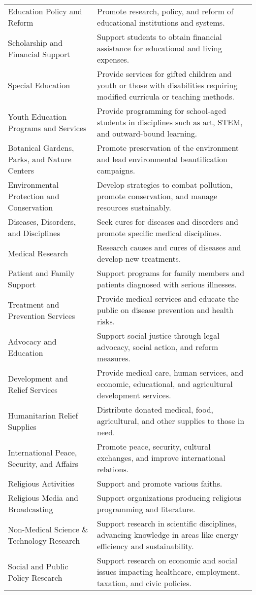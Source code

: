 \begin{table}[h!]
\begin{tabular}{p{5cm} p{10cm}}
Education Policy and Reform & Promote research, policy, and reform of educational institutions and systems. \\
Scholarship and Financial Support & Support students to obtain financial assistance for educational and living expenses. \\
Special Education & Provide services for gifted children and youth or those with disabilities requiring modified curricula or teaching methods. \\
Youth Education Programs and Services & Provide programming for school-aged students in disciplines such as art, STEM, and outward-bound learning. \\
Botanical Gardens, Parks, and Nature Centers & Promote preservation of the environment and lead environmental beautification campaigns. \\
Environmental Protection and Conservation & Develop strategies to combat pollution, promote conservation, and manage resources sustainably. \\
Diseases, Disorders, and Disciplines & Seek cures for diseases and disorders and promote specific medical disciplines. \\
Medical Research & Research causes and cures of diseases and develop new treatments. \\
Patient and Family Support & Support programs for family members and patients diagnosed with serious illnesses. \\
Treatment and Prevention Services & Provide medical services and educate the public on disease prevention and health risks. \\
Advocacy and Education & Support social justice through legal advocacy, social action, and reform measures. \\
Development and Relief Services & Provide medical care, human services, and economic, educational, and agricultural development services. \\
Humanitarian Relief Supplies & Distribute donated medical, food, agricultural, and other supplies to those in need. \\
International Peace, Security, and Affairs & Promote peace, security, cultural exchanges, and improve international relations. \\
Religious Activities & Support and promote various faiths. \\
Religious Media and Broadcasting & Support organizations producing religious programming and literature. \\
Non-Medical Science \& Technology Research & Support research in scientific disciplines, advancing knowledge in areas like energy efficiency and sustainability. \\
Social and Public Policy Research & Support research on economic and social issues impacting healthcare, employment, taxation, and civic policies. \\
\bottomrule
\end{tabular}
\end{table}
    